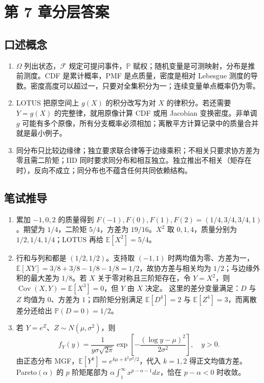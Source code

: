 \chapter{第 7 章分层答案}
\label{app:ch07-solutions}

\section*{口述概念}
\begin{enumerate}[leftmargin=*]
  \item $\Omega$ 列出状态，$\mathcal F$ 规定可提问事件，$\mathbb P$ 赋权；随机变量是可测映射，分布是推前测度。CDF 是累计概率，PMF 是点质量，密度是相对 Lebesgue 测度的导数。密度高度可以超过一，只要对全集积分为一；连续变量单点概率仍为零。
  \item LOTUS 把原空间上 $g(X)$ 的积分改写为对 $X$ 的律积分。若还需要 $Y=g(X)$ 的完整律，就用原像计算 CDF 或用 Jacobian 变换密度。非单调 $g$ 可能有多个原像，所有分支概率必须相加；离散平方计算记录中的质量合并就是最小例子。
  \item 同分布只比较边缘律；独立要求联合律等于边缘乘积；不相关只要求协方差为零且需二阶矩；IID 同时要求同分布和相互独立。独立推出不相关（矩存在时），反向不成立；同分布也不蕴含任何共同依赖结构。
\end{enumerate}

\section*{笔试推导}
\begin{enumerate}[leftmargin=*]
  \item 累加 $-1,0,2$ 的质量得到 $F(-1),F(0),F(1),F(2)=(1/4,3/4,3/4,1)$。期望为 $1/4$，二阶矩 $5/4$，方差为 $19/16$。$X^2$ 取 $0,1,4$，质量分别为 $1/2,1/4,1/4$；LOTUS 再给 $\mathbb E[X^2]=5/4$。
  \item 行和与列和都是 $(1/2,1/2)$。支持取 $(-1,1)$ 时两均值为零、方差为一，$\mathbb E[XY]=3/8+3/8-1/8-1/8=1/2$，故协方差与相关均为 $1/2$；与边缘外积的最大差为 $1/8$。若 $X$ 关于零对称且三阶矩存在，令 $Y=X^2$，则 $\operatorname{Cov}(X,Y)=\mathbb E[X^3]=0$，但 $Y$ 由 $X$ 决定。
  这里的差分变量满足：$D$ 与 $Z$ 均值为 $0$、方差为 $1$；四阶矩分别满足 $\mathbb E[D^4]=2$ 与 $\mathbb E[Z^4]=3$，而离散差分还给出 $\mathbb P(D=0)=1/2$。
  \item 若 $Y=e^Z$、$Z\sim N(\mu,\sigma^2)$，则
  \[
   f_Y(y)=\frac{1}{y\sigma\sqrt{2\pi}}
   \exp\!\left[-\frac{(\log y-\mu)^2}{2\sigma^2}\right],\quad y>0.
  \]
  由正态分布 MGF，$\mathbb E[Y^k]=e^{k\mu+k^2\sigma^2/2}$，代入 $k=1,2$ 得正文均值方差。Pareto$(\alpha)$ 的 $p$ 阶矩尾部为 $\alpha\int_1^\infty x^{p-\alpha-1}dx$，恰在 $p-\alpha<0$ 时收敛。
\end{enumerate}

